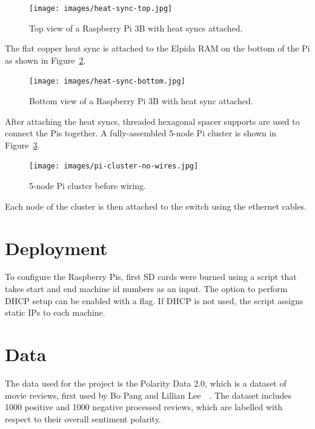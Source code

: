 \begin{figure}[!ht]
  \centering\texttt{[image: images/heat-sync-top.jpg]}
  \caption{Top view of a Raspberry Pi 3B with heat syncs attached.}\label{f:heat-sync-top}
\end{figure}

The flat copper heat sync is attached to the Elpida RAM on the bottom
of the Pi as shown in Figure~\ref{f:heat-sync-bottom}.

\begin{figure}[!ht]
  \centering\texttt{[image: images/heat-sync-bottom.jpg]}
  \caption{Bottom view of a Raspberry Pi 3B with heat sync attached.}\label{f:heat-sync-bottom}
\end{figure}

After attaching the heat syncs, threaded hexagonal spacer supports are used to connect the Pis together. A fully-assembled 5-node Pi cluster is shown in Figure~\ref{f:cluster-no-wires}.

\begin{figure}[!ht]
  \centering\texttt{[image: images/pi-cluster-no-wires.jpg]}
  \caption{5-node Pi cluster before wiring.}\label{f:cluster-no-wires}
\end{figure}

Each node of the cluster is then attached to the switch using the ethernet cables. 

\section{Deployment}
To configure the Raspberry Pis, first SD cards were burned using a
script that takes start and end machine id numbers as an input. The
option to perform DHCP setup can be enabled with a flag. If DHCP is
not used, the script assigns static IPs to each machine.

\section{Data}

The data used for the project is the Polarity Data 2.0, which is a dataset of 
movie reviews, first used by Bo Pang and Lillian 
Lee~\cite{hid-sp18-405-sentiment-pang2004asentimental}~\cite{hid-sp18-405-sentiment-pang2002thumbs}.
 The dataset includes 1000 positive and 1000 negative processed reviews, 
which are labelled with respect to their overall sentiment polarity. 

